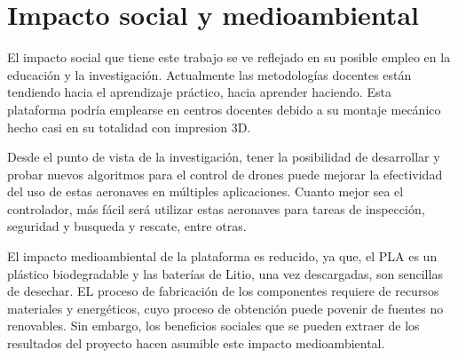 \chapter{Impacto social y medioambiental}

El impacto social que tiene este trabajo se ve reflejado en su posible empleo en la educación y la investigación. Actualmente las metodologías docentes están tendiendo hacia el aprendizaje práctico, hacia aprender haciendo. Esta plataforma podría emplearse en centros docentes debido a su montaje mecánico hecho casi en su totalidad con impresion 3D.

Desde el punto de vista de la investigación, tener la posibilidad de desarrollar y probar nuevos algoritmos para el control de drones puede mejorar la efectividad del uso de estas aeronaves en múltiples aplicaciones. Cuanto mejor sea el controlador, más fácil será utilizar estas aeronaves para tareas de inspección, seguridad y busqueda y rescate, entre otras.

El impacto medioambiental de la plataforma es reducido, ya que, el PLA es un plástico biodegradable y las baterías de Litio, una vez descargadas, son sencillas de desechar. EL proceso de fabricación de los componentes requiere de recursos materiales y energéticos, cuyo proceso de obtención  puede povenir de fuentes no renovables. Sin embargo, los beneficios sociales que se pueden extraer de los resultados del proyecto hacen asumible este impacto medioambiental.


